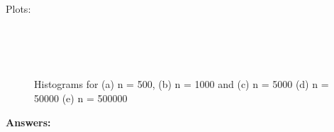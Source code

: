 \documentclass[11pt]{article}
\begin{document}
{\begin{lstlisting}
\end{lstlisting}
Plots:\\\\
\begin{figure}[H]
	\centering
	\\
	\\
	\caption{Histograms for (a) n = 500, (b) n = 1000 and (c) n = 5000 (d) n = 50000 (e) n = 500000}
\end{figure}
\textbf{Answers:}

}
\end{document}
